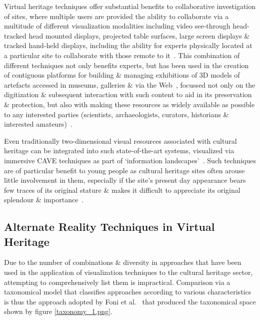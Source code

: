 Virtual heritage techniques offer substantial benefits to collaborative investigation of sites, where multiple users are provided the ability to collaborate via a multitude of different visualization modalities including video see-through head-tracked head mounted displays, projected table surfaces, large screen displays \& tracked hand-held displays, including the ability for experts physically located at a particular site to collaborate with those remote to it~\cite{benko:collaborative}. This combination of different techniques not only benefits experts, but has been used in the creation of contiguous platforms for building \& managing exhibitions of 3D models of artefacts accessed in museums, galleries \& via the Web~\cite{Wojciechowski2004}, focussed not only on the digitization \& subsequent interaction with such content to aid in its preservation \& protection, but also with making these resources as widely available as possible to any interested parties (scientists, archaeologists, curators, historians \& interested amateurs)~\cite{walczak:applications}.

Even traditionally two-dimensional visual resources associated with cultural heritage can be integrated into such state-of-the-art systems, visualized via immersive CAVE techniques as part of `information landscapes'~\cite{Ruffaldi2008}. Such techniques are of particular benefit to young people as cultural heritage sites often arouse little involvement in them, especially if the site's present day appearance bears few traces of its original stature \& makes it difficult to appreciate its original splendour \& importance~\cite{ardito:combining}.


\subsection{Alternate Reality Techniques in Virtual Heritage}

Due to the number of combinations \& diversity in approaches that have been used in the application of visualization techniques to the cultural heritage sector, attempting to comprehensively list them is impractical. Comparison via a taxonomical model that classifies approaches according to various characteristics is thus the approach adopted by Foni et al.~\cite{Foni2010} that produced the taxonomical space shown by figure \ref{taxonomy_1.png}.


